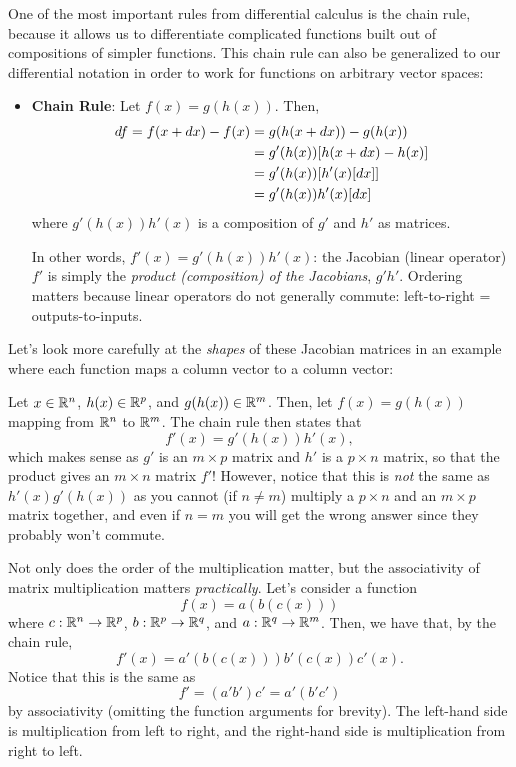 One of the most important rules from differential calculus is the chain rule, because it allows us to differentiate complicated functions built out of compositions of simpler functions.   This chain rule can also be generalized to our differential notation in order to work for functions on arbitrary vector spaces:
\begin{itemize}
    \item \textbf{Chain Rule}: Let $f(x) = g(h(x))$. Then,
    \begin{align*}
    d f = f(x + d x) - f(x) &= g(h( x + d x)) - g(h(x)) \\
    &= g'(h(x))[h(x + d x) - h(x)] \\
    &= g'(h(x))[h'(x)[d x]] \\
    &= g'(h(x)) h'(x) [d x]
    \end{align*}
    where $g'(h(x))h'(x)$ is a composition of $g'$ and $h'$ as matrices.

    In other words, $f'(x) = g'(h(x)) h'(x)$: the Jacobian (linear operator) $f'$ is simply the \emph{product (composition) of the Jacobians}, $g' h'$.  Ordering matters because linear operators do not generally commute: left-to-right = outputs-to-inputs.
\end{itemize}

Let's look more carefully at the \emph{shapes} of these Jacobian matrices in an example where each function maps a column vector to a column vector:
\begin{example}
    Let $x\in \mathbb R^n$, $h(x) \in \mathbb R^p$, and $g(h(x)) \in \mathbb R^m$. Then, let $f(x) = g(h(x))$ mapping from $\mathbb R^n$ to $\mathbb R^m$. The chain rule then states that
    \[
    f'(x) = g'(h(x)) h'(x),
    \]
    which makes sense as $g'$ is an $m\times p$ matrix and $h'$ is a $p\times n$ matrix, so that the product gives an $m \times n$ matrix $f'$! However, notice that this is \textit{not} the same as $h'(x) g'(h(x))$ as you cannot (if $n\neq m$) multiply a $p\times n$ and an $m\times p$ matrix together, and even if $n = m$ you will get the wrong answer since they probably won't commute.
\end{example}

Not only does the order of the multiplication matter, but the associativity of matrix multiplication matters \textit{practically}. Let's consider a function
\[
f(x)= a(b(c(x)))
\]
where $c: \mathbb R^n \to \mathbb R^p$, $b:\mathbb R^p \to \mathbb R^q$, and $a: \mathbb R^q\to \mathbb R^m$. Then, we have that, by the chain rule,
\[
f'(x) = a'(b(c(x))) b'(c(x))c'(x).
\]
Notice that this is the same as
\[
f'  = (a' b')c' = a'(b'c')
\]
by associativity (omitting the function arguments for brevity). The left-hand side is multiplication from left to right, and the right-hand side is multiplication from right to left.

